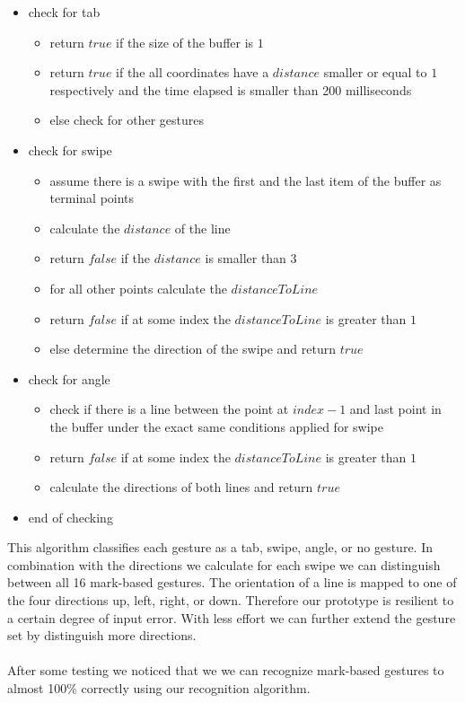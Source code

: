 \begin{itemize}
\item check for tab
	\begin{itemize}
		\item return $true$ if the size of the buffer is $1$ 
		\item return $true$ if the all coordinates have a $distance$ smaller or equal to $1$ respectively and the time elapsed is smaller than 200 milliseconds
		\item else check for other gestures
	\end{itemize}
\item check for swipe
	\begin{itemize}
	\item assume there is a swipe with the first and the last item of the buffer as terminal points
	\item calculate the $distance$ of the line
	\item return $false$ if the $distance$ is smaller than $3$
	\item for all other points calculate the $distanceToLine$ 
	\item return $false$ if at some index the $distanceToLine$ is greater than $1$
	\item else determine the direction of the swipe and return $true$
	\end{itemize}
\item check for angle
	\begin{itemize}
	\item check if there is a line between the point at $ index - 1$ and last point in the buffer under the exact same conditions applied for swipe
	\item return $false$ if at some index the $distanceToLine$ is greater than $1$
	\item calculate the directions of both lines and return $true$
	\end{itemize}
\item end of checking 
\end{itemize}
This algorithm classifies each gesture as a tab, swipe, angle, or no gesture. In combination with the directions we calculate for each swipe we can distinguish between all 16 mark-based gestures. The orientation of a line is mapped to one of the four directions up, left, right, or down. Therefore our prototype is resilient to a certain degree of input error. With less effort we can further extend the gesture set by distinguish more directions. 
\\ \\
After some testing we noticed that we we can recognize mark-based gestures to almost 100\% correctly using our recognition algorithm. 




